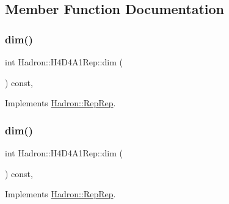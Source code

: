 \subsection{Member Function Documentation}
\mbox{\label{structHadron_1_1H4D4A1Rep_ac8019302ca0c70527f76bd346de43b43}} 
\subsubsection{\texorpdfstring{dim()}{dim()}\hspace{0.1cm}{\footnotesize\ttfamily [1/5]}}
{\footnotesize\ttfamily int Hadron\+::\+H4\+D4\+A1\+Rep\+::dim (\begin{DoxyParamCaption}{ }\end{DoxyParamCaption}) const\hspace{0.3cm}{\ttfamily [inline]}, {\ttfamily [virtual]}}



Implements \mbox{\hyperlink{structHadron_1_1RepRep_a92c8802e5ed7afd7da43ccfd5b7cd92b}{Hadron\+::\+Rep\+Rep}}.

\mbox{\label{structHadron_1_1H4D4A1Rep_ac8019302ca0c70527f76bd346de43b43}} 
\subsubsection{\texorpdfstring{dim()}{dim()}\hspace{0.1cm}{\footnotesize\ttfamily [2/5]}}
{\footnotesize\ttfamily int Hadron\+::\+H4\+D4\+A1\+Rep\+::dim (\begin{DoxyParamCaption}{ }\end{DoxyParamCaption}) const\hspace{0.3cm}{\ttfamily [inline]}, {\ttfamily [virtual]}}



Implements \mbox{\hyperlink{structHadron_1_1RepRep_a92c8802e5ed7afd7da43ccfd5b7cd92b}{Hadron\+::\+Rep\+Rep}}.

\mbox{\label{structHadron_1_1H4D4A1Rep_ac8019302ca0c70527f76bd346de43b43}} 
